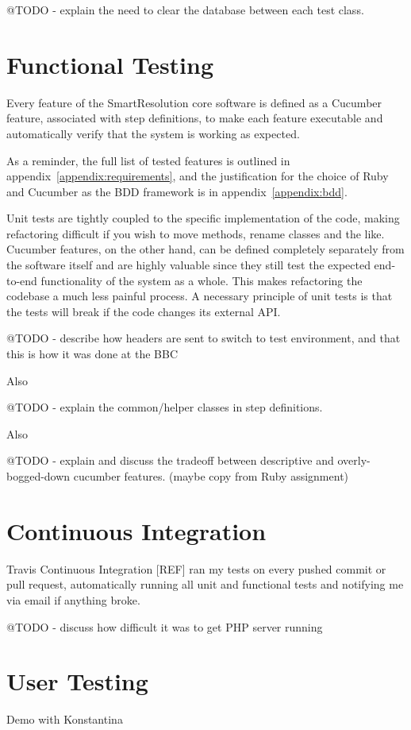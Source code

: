 @TODO - explain the need to clear the database between each test class.

\section{Functional Testing}

Every feature of the SmartResolution core software is defined as a Cucumber feature, associated with step definitions, to make each feature executable and automatically verify that the system is working as expected.

As a reminder, the full list of tested features is outlined in appendix~\ref{appendix:requirements}, and the justification for the choice of Ruby and Cucumber as the BDD framework is in appendix~\ref{appendix:bdd}.

Unit tests are tightly coupled to the specific implementation of the code, making refactoring difficult if you wish to move methods, rename classes and the like. Cucumber features, on the other hand, can be defined completely separately from the software itself and are highly valuable since they still test the expected end-to-end functionality of the system as a whole. This makes refactoring the codebase a much less painful process. A necessary principle of unit tests is that the tests will break if the code changes its external API.

@TODO - describe how headers are sent to switch to test environment, and that this is how it was done at the BBC

Also

@TODO - explain the common/helper classes in step definitions.

Also

@TODO - explain and discuss the tradeoff between descriptive and overly-bogged-down cucumber features. (maybe copy from Ruby assignment)

\section{Continuous Integration}

Travis Continuous Integration [REF] ran my tests on every pushed commit or pull request, automatically running all unit and functional tests and notifying me via email if anything broke.

@TODO - discuss how difficult it was to get PHP server running

\section{User Testing}

Demo with Konstantina